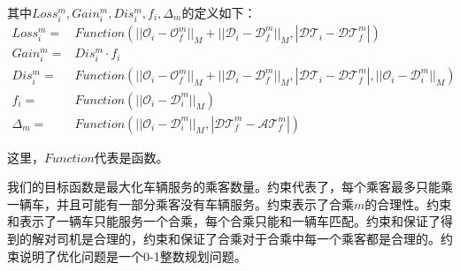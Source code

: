 其中$Loss_i^m, Gain_i^m, Dis_i^m, f_i, \Delta_m$的定义如下：
\[
\begin{aligned}
Loss_i^m =& Function(||\mathcal{O}_i-\mathcal{O}_f^m||_M+||\mathcal{D}_i-\mathcal{D}_f^m||_M, |\mathcal{DT}_i-\mathcal{DT}_f^m|)\\
Gain_i^m = & Dis_i^m \cdot f_i\\
Dis_i^m = & Function(||\mathcal{O}_i-\mathcal{O}_f^m||_M+||\mathcal{D}_i-\mathcal{D}_f^m||_M, |\mathcal{DT}_i-\mathcal{DT}_f^m|, ||\mathcal{O}_i-\mathcal{D}_i^m||_M)\\
f_i = & Function(||\mathcal{O}_i-\mathcal{D}_i^m||_M)\\
\Delta_m = & Function(||\mathcal{O}_i-\mathcal{D}_i^m||_M,|\mathcal{DT}_f^m-\mathcal{AT}_f^m|)
\end{aligned}
\]
\par
这里，$Function$代表是函数。
\par
我们的目标函数是最大化车辆服务的乘客数量。约束\label{eq:c1}代表了，每个乘客最多只能乘一辆车，并且可能有一部分乘客没有车辆服务。约束\label{eq:c2}表示了合乘$m$的合理性。约束\label{eq:c3}和\label{eq:c4}表示了一辆车只能服务一个合乘，每个合乘只能和一辆车匹配。约束\label{eq:c5}和\label{eq:c7}保证了得到的解对司机是合理的，约束\label{eq:c6}和\label{eq:c8}保证了合乘对于合乘中每一个乘客都是合理的。约束\label{eq:c9}说明了优化问题是一个0-1整数规划问题。

